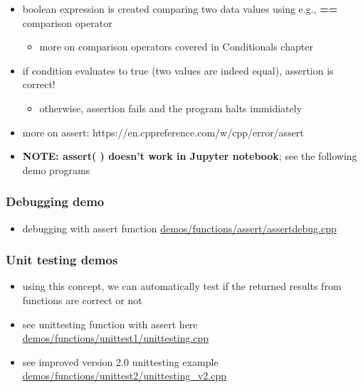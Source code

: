 \documentclass[11pt]{article}
\providecommand{\tightlist}{%
      \setlength{\itemsep}{0pt}\setlength{\parskip}{0pt}}
\begin{document}
\begin{itemize}
\tightlist
\item
  boolean expression is created comparing two data values using e.g.,
  \textbf{==} comparison operator

  \begin{itemize}
  \tightlist
  \item
    more on comparison operators covered in Conditionals chapter
  \end{itemize}
\item
  if condition evaluates to true (two values are indeed equal),
  assertion is correct!

  \begin{itemize}
  \tightlist
  \item
    otherwise, assertion fails and the program halts immidiately
  \end{itemize}
\item
  more on assert: https://en.cppreference.com/w/cpp/error/assert
\item
  \textbf{NOTE: assert( ) doesn't work in Jupyter notebook}; see the
  following demo programs
\end{itemize}

    \hypertarget{debugging-demo}{%
\subsubsection{Debugging demo}\label{debugging-demo}}

\begin{itemize}
\tightlist
\item
  debugging with assert function
  \url{demos/functions/assert/assertdebug.cpp}
\end{itemize}

\hypertarget{unit-testing-demos}{%
\subsubsection{Unit testing demos}\label{unit-testing-demos}}

\begin{itemize}
\item
  using this concept, we can automatically test if the returned results
  from functions are correct or not
\item
  see unittesting function with assert here
  \url{demos/functions/unittest1/unittesting.cpp}
\item
  see improved version 2.0 unittesting example
  \url{demos/functions/unittest2/unittesting_v2.cpp}
\end{itemize}
\end{document}
